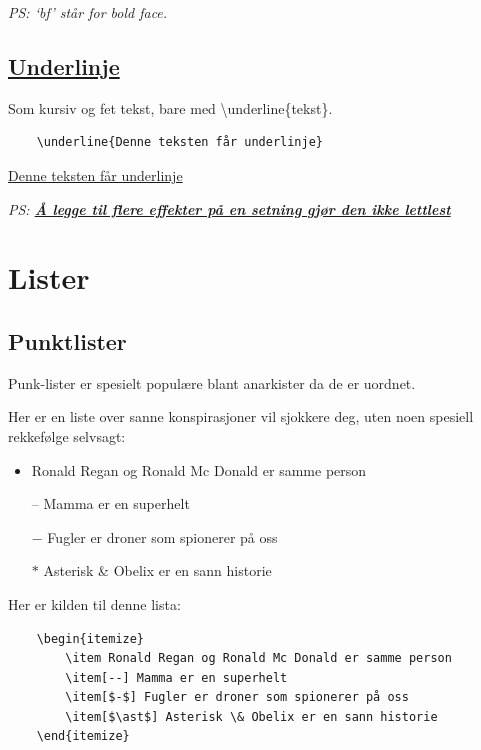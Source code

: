         \textit{PS: `bf' står for bold face.} 
        
        
    \subsection{\texorpdfstring{\underline{Underlinje}}{Underlinje}}
        Som kursiv og fet tekst, bare med \textbackslash underline\{tekst\}. 
        \begin{verbatim}
    \underline{Denne teksten får underlinje}
        \end{verbatim}
        \underline{Denne teksten får underlinje}
        
    
        \textit{PS: \textbf{\underline{Å legge til flere effekter på en setning gjør den ikke lettlest}}}
\section{Lister}
    \subsection{Punktlister}
        Punk-lister er spesielt populære blant anarkister da de er uordnet.
        
        Her er en liste over sanne konspirasjoner vil sjokkere deg, uten noen spesiell rekkefølge selvsagt:
        \begin{itemize}
            \item Ronald Regan og Ronald Mc Donald er samme person
            \item[--] Mamma er en superhelt
            \item[$-$] Fugler er droner som spionerer på oss
            \item[$\ast$] Asterisk \& Obelix er en sann historie
        \end{itemize}
        
        Her er kilden til denne lista:
        \begin{verbatim}
    \begin{itemize}
        \item Ronald Regan og Ronald Mc Donald er samme person
        \item[--] Mamma er en superhelt
        \item[$-$] Fugler er droner som spionerer på oss
        \item[$\ast$] Asterisk \& Obelix er en sann historie
    \end{itemize}
        \end{verbatim}
        
